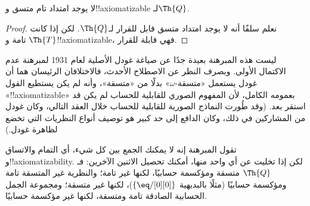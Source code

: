\documentclass[../../../include/open-logic-section]{subfiles}
\begin{document}


\begin{thm}
لا يوجد امتداد تام متسق و!!{axiomatizable} لـ$\Th{Q}$.
\end{thm}

\begin{proof}
نعلم سلفًا أنه لا يوجد امتداد متسق قابل للقرار لـ$\Th{Q}$. لكن إذا
كانت $\Th{T}$ تامة و!!{axiomatizable}، فهي قابلة للقرار.
\end{proof}

\begin{explain}
ليست هذه المبرهنة بعيدة جدًا عن صياغة غودل الأصلية لعام 1931 لمبرهنة
عدم الاكتمال الأولى. وبصرف النظر عن الاصطلاح الأحدث، فالاختلافان
الرئيسان هما أن غودل يستعمل «متسقة-$\omega$» بدلًا من «متسقة»، وأنه
لم يكن يستطيع القول «!!{axiomatizable}» بعمومه الكامل، لأن المفهوم
الصوري للقابلية للحساب لم يكن قد استقر بعد. (وقد طُورت النماذج الصورية
للقابلية للحساب خلال العقد التالي، وكان غودل من المشاركين في ذلك، وكان
الدافع إلى حد كبير هو توصيف أنواع النظريات التي تخضع لظاهرة غودل.)

تقول المبرهنة إنه لا يمكنك الجمع بين كل شيء، أي التمام والاتساق
و!!{axiomatizability}. لكن إذا تخليت عن أي واحد منها، أمكنك تحصيل
الاثنين الآخرين: فـ$\Th{Q}$ متسقة ومؤكسمة حسابيًا، لكنها غير تامة؛
والنظرية غير المتسقة تامة ومؤكسمة حسابيًا (مثلًا بالبديهية
$\{ \eq/[0][0] \}$)، لكنها غير متسقة؛ ومجموعة الجمل الحسابية الصادقة
تامة ومتسقة، لكنها غير مؤكسمة حسابيًا.
\end{explain}
\end{document}
